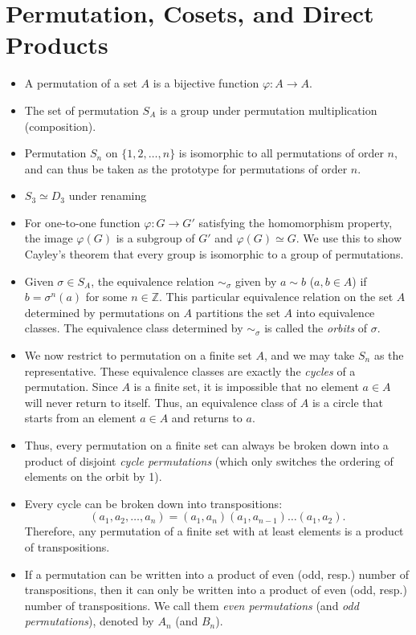 \documentclass{article}
\newcommand{\Z}{\mathbb{Z}}
\renewcommand{\phi}{\varphi}
\begin{document}
\section{Permutation, Cosets, and Direct Products}
\begin{itemize}
    \item A permutation of a set $A$ is a bijective function $\phi: A \to A$.
    \item The set of permutation $S_A$ is a group under permutation multiplication (composition).
    \item Permutation $S_n$ on $\{1,2,\dots,n\}$ is isomorphic to all permutations of order $n$, and can thus be taken as the prototype for permutations of order $n$.
    \item $S_3 \simeq D_3$ under renaming
    \item For one-to-one function $\phi: G \to G'$ satisfying the homomorphism property, the image $\phi(G)$ is a subgroup of $G'$ and $\phi(G) \simeq G$. We use this to show Cayley's theorem that every group is isomorphic to a group of permutations.
    \item Given $\sigma \in S_A$, the equivalence relation $\sim_\sigma$ given by $a \sim b$ ($a,b \in A$) if $b = \sigma^n(a)$ for some $n \in \Z$. This particular equivalence relation on the set $A$ determined by permutations on $A$ partitions the set $A$ into equivalence classes. The equivalence class determined by $\sim_\sigma$ is called the \textit{orbits} of $\sigma$.
    \item We now restrict to permutation on a finite set $A$, and we may take $S_n$ as the representative. These equivalence classes are exactly the \textit{cycles} of a permutation. Since $A$ is a finite set, it is impossible that no element $a \in A$ will never return to itself. Thus, an equivalence class of $A$ is a circle that starts from an element $a \in A$ and returns to $a$.
    \item Thus, every permutation on a finite set can always be broken down into a product of disjoint \textit{cycle permutations} (which only switches the ordering of elements on the orbit by 1).
    \item Every cycle can be broken down into transpositions: $$(a_1, a_2, \dots, a_n) = (a_1, a_n) (a_1, a_{n-1}) \dots (a_1,a_2).$$ Therefore, any permutation of a finite set with at least elements is a product of transpositions.
    \item If a permutation can be written into a product of even (odd, resp.) number of transpositions, then it can only be written into a product of even (odd, resp.) number of transpositions. We call them \textit{even permutations} (and \textit{odd permutations}), denoted by $A_n$ (and $B_n$).

\end{itemize}
\end{document}
